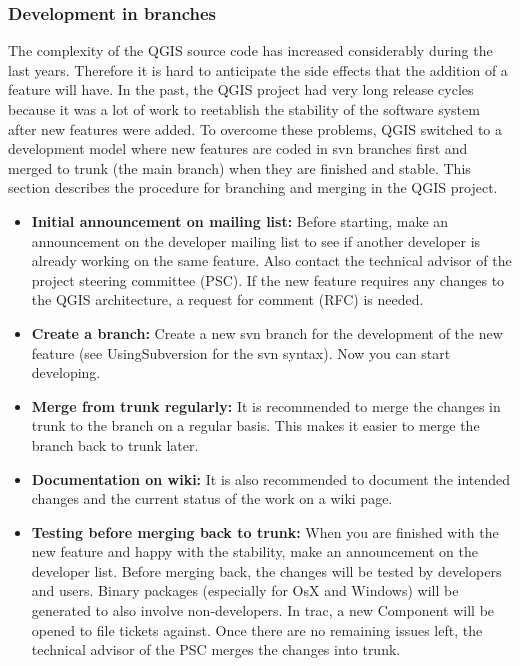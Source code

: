 \subsubsection{Development in branches}
The complexity of the QGIS source code has increased considerably during the
last years. Therefore it is hard to anticipate the side effects that the
addition of a feature will have. In the past, the QGIS project had very long
release cycles because it was a lot of work to reetablish the stability of the
software system after new features were added. To overcome these problems, QGIS
switched to a development model where new features are coded in svn branches
first and merged to trunk (the main branch) when they are finished and stable.
This section describes the procedure for branching and merging in the QGIS
project.

\begin{itemize}
\item \textbf{Initial announcement on mailing list:}
Before starting, make an announcement on the developer mailing list to see if
another developer is already working on the same feature. Also contact the
technical advisor of the project steering committee (PSC). If the new feature
requires any changes to the QGIS architecture, a request for comment (RFC) is
needed. 

\item \textbf{Create a branch:} 
Create a new svn branch for the development of the new feature (see
UsingSubversion for the svn syntax). Now you can start developing.

\item \textbf{Merge from trunk regularly:}
It is recommended to merge the changes in trunk to the branch on a regular
basis. This makes it easier to merge the branch back to trunk later.

\item \textbf{Documentation on wiki:} 
It is also recommended to document the intended changes and the current status
of the work on a wiki page.

\item \textbf{Testing before merging back to trunk:} 
When you are finished with the new feature and happy with the stability, make
an announcement on the developer list.  Before merging back, the changes will
be tested by developers and users. Binary packages (especially for OsX and
Windows) will be generated to also involve non-developers. In trac, a new
Component will be opened to file tickets against.  Once there are no remaining
issues left, the technical advisor of the PSC merges the changes into trunk.

\end{itemize}



